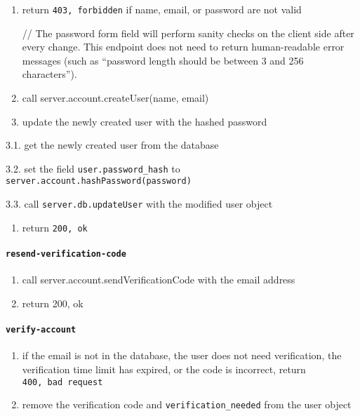 \begin{enumerate}
\def\labelenumi{\arabic{enumi}.}
\item
  return \texttt{403,\ forbidden} if name, email, or password are not
  valid

  // The password form field will perform sanity checks on the client
  side after every change. This endpoint does not need to return
  human-readable error messages (such as ``password length should be
  between 3 and 256 characters'').
\item
  call server.account.createUser(name, email)
\item
  update the newly created user with the hashed password
\end{enumerate}

3.1. get the newly created user from the database

3.2. set the field \texttt{user.password\_hash} to
\texttt{server.account.hashPassword(password)}

3.3. call \texttt{server.db.updateUser} with the modified user object

\begin{enumerate}
\def\labelenumi{\arabic{enumi}.}
\setcounter{enumi}{3}
\tightlist
\item
  return \texttt{200,\ ok}
\end{enumerate}

\hypertarget{resend-verification-code}{%
\paragraph{\texorpdfstring{\texttt{resend-verification-code}}{resend-verification-code}}\label{resend-verification-code}}

\begin{enumerate}
\def\labelenumi{\arabic{enumi}.}
\item
  call server.account.sendVerificationCode with the email address
\item
  return 200, ok
\end{enumerate}

\hypertarget{verify-account}{%
\paragraph{\texorpdfstring{\texttt{verify-account}}{verify-account}}\label{verify-account}}

\begin{enumerate}
\def\labelenumi{\arabic{enumi}.}
\item
  if the email is not in the database, the user does not need
  verification, the verification time limit has expired, or the code is
  incorrect, return \texttt{400,\ bad\ request}
\item
  remove the verification code and \texttt{verification\_needed} from
  the user object
\end{enumerate}

